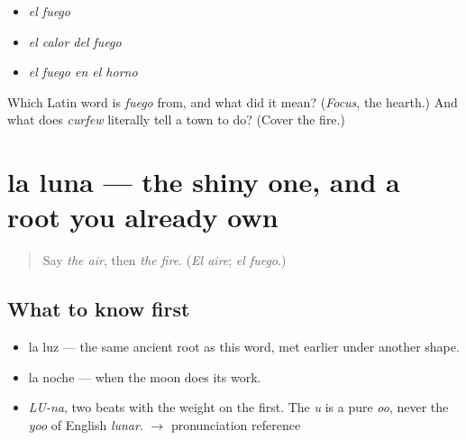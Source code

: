 \begin{itemize}
\raggedright
  \item \emph{el fuego}
  \item \emph{el calor del fuego}
  \item \emph{el fuego en el horno}
\end{itemize}

\begin{tcolorbox}[breakable,colback=teal!4,colframe=teal!35!black,title={Before you move on}]
Which Latin word is \emph{fuego} from, and what did it mean? (\emph{Focus}, the hearth.) And what does \emph{curfew} literally tell a town to do? (Cover the fire.)
\end{tcolorbox}
\section[la luna]{la luna — the shiny one, and a root you already own}

\label{lesson:ES-C362-luna}



\begin{quote}
Say \emph{the air}, then \emph{the fire}. (\emph{El aire}; \emph{el fuego}.)
\end{quote}

\subsection*{What to know first}
\begin{itemize}
\raggedright
  \item la luz — the same ancient root as this word, met earlier under another shape.
  \item la noche — when the moon does its work.
\end{itemize}

\begin{sounds}
\begin{itemize}
\raggedright
  \item \emph{LU-na}, two beats with the weight on the first. The \emph{u} is a pure \emph{oo}, never the \emph{yoo} of English \emph{lunar}. $\to$ pronunciation reference
\end{itemize}
\end{sounds}

